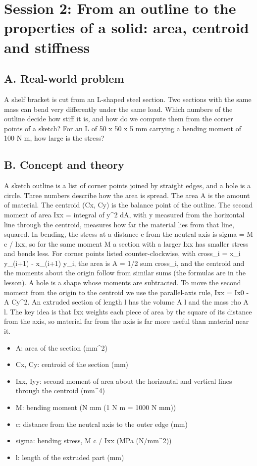 \documentclass[11pt,a4paper]{article}
\begin{document}
\section{Session 2: From an outline to the properties of a solid: area, centroid and stiffness}

\subsection*{A. Real-world problem}
A shelf bracket is cut from an L-shaped steel section. Two sections with the same mass can bend very differently under the same load. Which numbers of the outline decide how stiff it is, and how do we compute them from the corner points of a sketch? For an L of 50 x 50 x 5 mm carrying a bending moment of 100 N m, how large is the stress?

\subsection*{B. Concept and theory}
A sketch outline is a list of corner points joined by straight edges, and a hole is a circle. Three numbers describe how the area is spread. The area A is the amount of material. The centroid (Cx, Cy) is the balance point of the outline. The second moment of area Ixx = integral of y\textasciicircum{}2 dA, with y measured from the horizontal line through the centroid, measures how far the material lies from that line, squared. In bending, the stress at a distance c from the neutral axis is sigma = M c / Ixx, so for the same moment M a section with a larger Ixx has smaller stress and bends less. For corner points listed counter-clockwise, with cross\_i = x\_i y\_(i+1) - x\_(i+1) y\_i, the area is A = 1/2 sum cross\_i, and the centroid and the moments about the origin follow from similar sums (the formulas are in the lesson). A hole is a shape whose moments are subtracted. To move the second moment from the origin to the centroid we use the parallel-axis rule, Ixx = Ix0 - A Cy\textasciicircum{}2. An extruded section of length l has the volume A l and the mass rho A l. The key idea is that Ixx weights each piece of area by the square of its distance from the axis, so material far from the axis is far more useful than material near it.

\begin{itemize}[nosep]
\item A: area of the section (mm\textasciicircum{}2)
\item Cx, Cy: centroid of the section (mm)
\item Ixx, Iyy: second moment of area about the horizontal and vertical lines through the centroid (mm\textasciicircum{}4)
\item M: bending moment (N mm (1 N m = 1000 N mm))
\item c: distance from the neutral axis to the outer edge (mm)
\item sigma: bending stress, M c / Ixx (MPa (N/mm\textasciicircum{}2))
\item l: length of the extruded part (mm)
\end{itemize}
\end{document}
